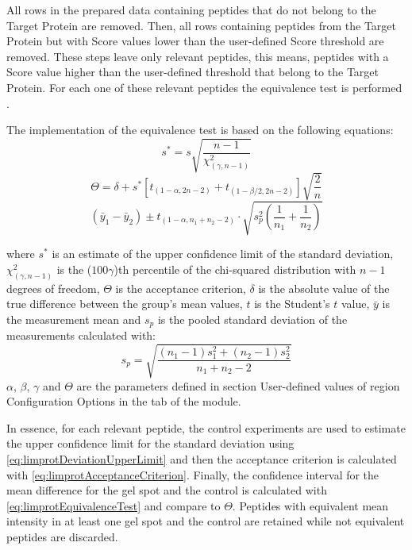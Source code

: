 All rows in the prepared data containing peptides that do not belong to the Target
Protein are removed. Then, all rows containing peptides from the Target Protein
but with Score values lower than the user-defined Score threshold are removed. These
steps leave only relevant peptides, this means, peptides with a Score value higher
than the user-defined threshold that belong to the Target Protein. For each one of
these relevant peptides the equivalence test is performed \cite{Limentani2005a}.

The implementation of the equivalence test is based on the following equations:
\begin{equation}
    \label{eq:limprotDeviationUpperLimit}
    s^* = s\sqrt{\frac{n-1}{\chi^2_{(\gamma, n-1)}}}
\end{equation}
\begin{equation}
\label{eq:limprotAcceptanceCriterion}
\Theta = \delta + s^*\left[t_{(1-\alpha, 2n-2)} + t_{(1-\beta/2, 2n-2)}\right]\sqrt{\frac{2}{n}}
\end{equation}
\begin{equation}
\label{eq:limprotEquivalenceTest}
(\bar{y}_1 - \bar{y}_2) \pm t_{(1-\alpha, n_1+n_2-2)} \cdot \sqrt{s^2_p\left(\frac{1}{n_1}+\frac{1}{n_2}\right)}
\end{equation}

where $s^*$ is an estimate of the upper confidence limit of the standard deviation,
$\chi^2_{(\gamma, n-1)}$ is the ($100\gamma$)th percentile of the chi-squared distribution
with $n-1$ degrees of freedom, $\Theta$ is the acceptance criterion, $\delta$ is the
absolute value of the true difference between the group's mean values, $t$ is the
Student's $t$ value, $\bar{y}$ is the measurement mean and $s_p$ is the pooled standard
deviation of the measurements calculated with:
\begin{equation}
\label{eq:poolStDev}
s_p =  \sqrt{\frac{(n_1-1)s^2_1+(n_2-1)s^2_2}{n_1+n_2-2}}
\end{equation}
$\alpha$, $\beta$, $\gamma$ and $\Theta$ are the parameters defined in section
User-defined values of region Configuration Options in the tab of the module.

In essence, for each relevant peptide, the control experiments are used to estimate
the upper confidence limit for the standard deviation using \autoref{eq:limprotDeviationUpperLimit}
and then the acceptance criterion is calculated with \autoref{eq:limprotAcceptanceCriterion}.
Finally, the confidence interval for the mean difference for the gel spot and the
control is calculated with \autoref{eq:limprotEquivalenceTest} and compare to $\Theta$.
Peptides with equivalent mean intensity in at least one gel spot and the control
are retained while not equivalent peptides are discarded.

